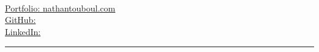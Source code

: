 \begin{center}
	\begin{minipage}[b]{.3\textwidth}
	\raggedright
	{\phone} \\ %
	{\city} \\ %
	\href{mailto:\email}{\email} %
	\end{minipage}%
	\begin{minipage}[b]{.4\textwidth}
	\makeatletter
	\centering {\huge \@author} \\
	\makeatother
    \vspace{.5em}
    {\color{highlight} \Large{\role}}
	\end{minipage}%
	\begin{minipage}[b]{.3\textwidth}
	\raggedleft
	

	\href{https://nathantouboul.com/}				{Portfolio: nathantouboul.com} \\%
	\href{https://github.com/\github}				{GitHub: \github} \\%
	\href{https://www.linkedin.com/in/\LinkedIn}	{LinkedIn: \LinkedIn} %

	

	\end{minipage}

\vspace{0.25ex}

{\color{highlight} \hrule height 0.025cm }
\vspace{0.5ex}
\end{center} 